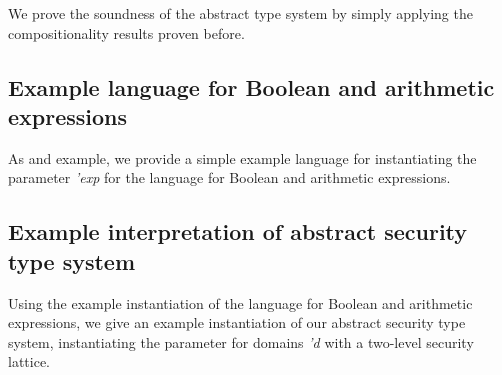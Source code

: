 \documentclass[11pt,a4paper]{article}
\begin{document}
We prove the soundness of the abstract type system by simply applying
the compositionality results proven before.



\subsection{Example language for Boolean and arithmetic expressions}

As and example, we provide a simple example language for instantiating the parameter
\textit{'exp} for the language for Boolean and arithmetic expressions.



\subsection{Example interpretation of abstract security type system}

Using the example instantiation of the language for Boolean and
arithmetic expressions, we give an example instantiation of our
abstract security type system, instantiating the parameter for domains
\textit{'d} with a two-level security lattice.








\end{document}

